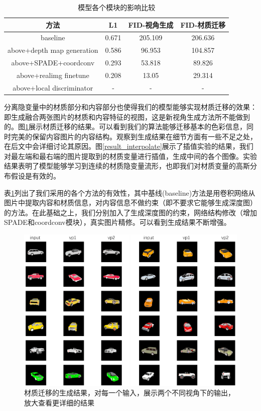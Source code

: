 \documentclass[UTF8,openany,AutoFakeBold,AutoFakeSlant,cs4size]{ctexbook}
\begin{document}
\begin{table}[h]
\small %
\centering
\caption{模型各个模块的影响比较}
\label{ablation_study}
\begin{tabular}{cccc} %
\toprule %
方法 & L1 & FID-视角生成 & FID-材质迁移 \\
\midrule
baseline & 0.671 & 205.109 & 206.636 \\
above+depth map generation & 0.586 & 96.953 & 104.857 \\
above+SPADE+coordconv & 0.293 & 53.818 & 89.826 \\
above+realimg finetune & 0.208 & 13.05 & 29.314 \\
above+local discriminator & - & - & - \\
\bottomrule
\end{tabular}
\end{table}

分离隐变量中的材质部分和内容部分也使得我们的模型能够实现材质迁移的效果：即生成融合两张图片的材质和内容特征的视图，这是新视角生成方法所不能做到的。图\ref{result_styletrans}展示材质迁移的结果。可以看到我们的算法能够迁移基本的色彩信息，同时完美的保留内容图片的内容结构。观察到生成结果在细节方面有一些不足之处，在后文中会详细讨论其原因。图\ref{result_interpolate}展示了插值实验的结果，我们对最左端和最右端的图片提取到的材质变量进行插值，生成中间的各个图像。实验结果表明了模型能够学习到连续的材质隐变量流形，也即我们对材质变量的高斯分布假设是有效的。

表\ref{ablation_study}列出了我们采用的各个方法的有效性，其中基线(baseline)方法是用卷积网络从图片中提取内容和材质信息，对内容信息不做约束（即不要求它能够生成深度图）的方法。在此基础之上，我们分别加入了生成深度图的约束，网络结构修改（增加SPADE和coordconv模块），真实图片精修。可以看到生成结果不断增强。

\begin{figure}
\centering
\includegraphics[width=\linewidth]{./images/style_transfer_thesis.png}
\caption{材质迁移的生成结果，对每一个输入，展示两个不同视角下的输出，放大查看更详细的结果}
\label{result_styletrans}
\end{figure}
\end{document}
